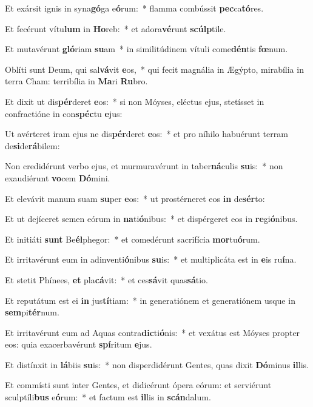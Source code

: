 \item Et exársit ignis in syna\textbf{gó}ga e\textbf{ó}rum:~* flamma combússit \textbf{pec}ca\textbf{tó}res.
\item Et fecérunt vítu\textbf{lum} in \textbf{Ho}reb:~* et adora\textbf{vé}runt \textbf{scúlp}tile.
\item Et mutavérunt \textbf{gló}riam \textbf{su}am~* in similitúdinem vítuli come\textbf{dén}tis \textbf{fœ}num.
\item Oblíti sunt Deum, qui sal\textbf{vá}vit \textbf{e}os,~* qui fecit magnália in Ægýpto, mirabília in terra Cham: terribília in \textbf{Ma}ri \textbf{Ru}bro.
\item Et dixit ut dis\textbf{pér}deret \textbf{e}os:~* si non Móyses, eléctus ejus, stetísset in confractióne in con\textbf{spéc}tu \textbf{e}jus:
\item Ut avérteret iram ejus ne dis\textbf{pér}deret \textbf{e}os:~* et pro níhilo habuérunt terram de\textbf{si}de\textbf{rá}bilem:
\item Non credidérunt verbo ejus, et murmuravérunt in taber\textbf{ná}culis \textbf{su}is:~* non exaudiérunt \textbf{vo}cem \textbf{Dó}mini.
\item Et elevávit manum suam \textbf{su}per \textbf{e}os:~* ut prostérneret eos \textbf{in} de\textbf{sér}to:
\item Et ut dejíceret semen eórum in \textbf{na}ti\textbf{ó}nibus:~* et dispérgeret eos in \textbf{re}gi\textbf{ó}nibus.
\item Et initiáti \textbf{sunt} Be\textbf{él}phegor:~* et comedérunt sacrifícia \textbf{mor}tu\textbf{ó}rum.
\item Et irritavérunt eum in adinventi\textbf{ó}nibus \textbf{su}is:~* et multiplicáta est in \textbf{e}is ru\textbf{í}na.
\item Et stetit Phínees, \textbf{et} pla\textbf{cá}vit:~* et ces\textbf{sá}vit quas\textbf{sá}tio.
\item Et reputátum est ei \textbf{in} jus\textbf{tí}tiam:~* in generatiónem et generatiónem usque in \textbf{sem}pi\textbf{tér}num.
\item Et irritavérunt eum ad Aquas contra\textbf{dic}ti\textbf{ó}nis:~* et vexátus est Móyses propter eos: quia exacerbavérunt \textbf{spí}ritum \textbf{e}jus.
\item Et distínxit in \textbf{lá}biis \textbf{su}is:~* non disperdidérunt Gentes, quas dixit \textbf{Dó}minus \textbf{il}lis.
\item Et commísti sunt inter Gentes, et didicérunt ópera eórum: et serviérunt sculptíli\textbf{bus} e\textbf{ó}rum:~* et factum est \textbf{il}lis in \textbf{scán}dalum.
